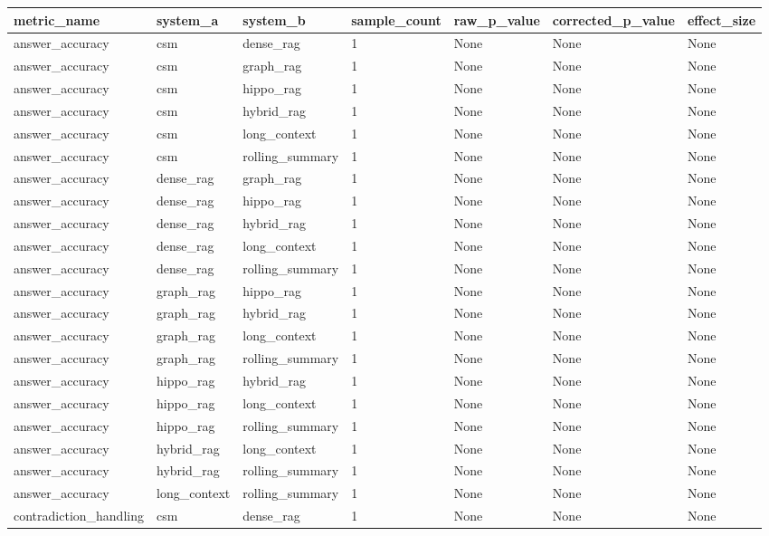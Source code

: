 \begin{tabular}{lllllll}
metric_name & system_a & system_b & sample_count & raw_p_value & corrected_p_value & effect_size \\
\hline
answer\_accuracy & csm & dense\_rag & 1 & None & None & None \\
answer\_accuracy & csm & graph\_rag & 1 & None & None & None \\
answer\_accuracy & csm & hippo\_rag & 1 & None & None & None \\
answer\_accuracy & csm & hybrid\_rag & 1 & None & None & None \\
answer\_accuracy & csm & long\_context & 1 & None & None & None \\
answer\_accuracy & csm & rolling\_summary & 1 & None & None & None \\
answer\_accuracy & dense\_rag & graph\_rag & 1 & None & None & None \\
answer\_accuracy & dense\_rag & hippo\_rag & 1 & None & None & None \\
answer\_accuracy & dense\_rag & hybrid\_rag & 1 & None & None & None \\
answer\_accuracy & dense\_rag & long\_context & 1 & None & None & None \\
answer\_accuracy & dense\_rag & rolling\_summary & 1 & None & None & None \\
answer\_accuracy & graph\_rag & hippo\_rag & 1 & None & None & None \\
answer\_accuracy & graph\_rag & hybrid\_rag & 1 & None & None & None \\
answer\_accuracy & graph\_rag & long\_context & 1 & None & None & None \\
answer\_accuracy & graph\_rag & rolling\_summary & 1 & None & None & None \\
answer\_accuracy & hippo\_rag & hybrid\_rag & 1 & None & None & None \\
answer\_accuracy & hippo\_rag & long\_context & 1 & None & None & None \\
answer\_accuracy & hippo\_rag & rolling\_summary & 1 & None & None & None \\
answer\_accuracy & hybrid\_rag & long\_context & 1 & None & None & None \\
answer\_accuracy & hybrid\_rag & rolling\_summary & 1 & None & None & None \\
answer\_accuracy & long\_context & rolling\_summary & 1 & None & None & None \\
contradiction\_handling & csm & dense\_rag & 1 & None & None & None \\

\end{tabular}
